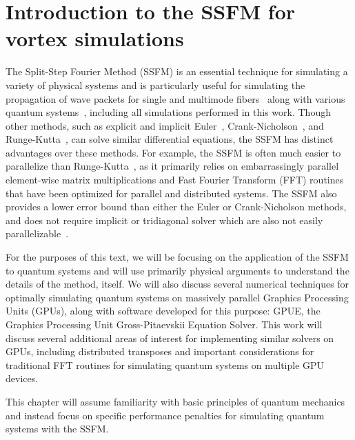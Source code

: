 \chapter{Introduction to the SSFM for vortex simulations}
\label{ch:splitop}
The Split-Step Fourier Method (SSFM) is an essential technique for simulating a variety of physical systems and is particularly useful for simulating the propagation of wave packets for single and multimode fibers~\cite{agrawal2000, sinkin2003, meirelles2005, min2003} along with various quantum systems~\cite{bayindir2015, weideman1986, wang2005}, including all simulations performed in this work.
Though other methods, such as explicit and implicit Euler~\cite{butcher2016}, Crank-Nicholson~\cite{crank1947}, and Runge-Kutta~\cite{butcher2016}, can solve similar differential equations, the SSFM has distinct advantages over these methods.
For example, the SSFM is often much easier to parallelize than Runge-Kutta~\cite{brehler2017}, as it primarily relies on embarrassingly parallel element-wise matrix multiplications and Fast Fourier Transform (FFT) routines that have been optimized for parallel and distributed systems.
The SSFM also provides a lower error bound than either the Euler or Crank-Nicholson methods, and does not require implicit or tridiagonal solver \cite{conte2017, thomas1949} which are also not easily parallelizable~\cite{goddeke2010, wang1981, sweet1977}.

For the purposes of this text, we will be focusing on the application of the SSFM to quantum systems and will use primarily physical arguments to understand the details of the method, itself.
We will also discuss several numerical techniques for optimally simulating quantum systems on massively parallel Graphics Processing Units (GPUs), along with software developed for this purpose: GPUE, the Graphics Processing Unit Gross-Pitaevskii Equation Solver.
This work will discuss several additional areas of interest for implementing similar solvers on GPUs, including distributed transposes and important considerations for traditional FFT routines for simulating quantum systems on multiple GPU devices.


This chapter will assume familiarity with basic principles of quantum mechanics and instead focus on specific performance penalties for simulating quantum systems with the SSFM.

